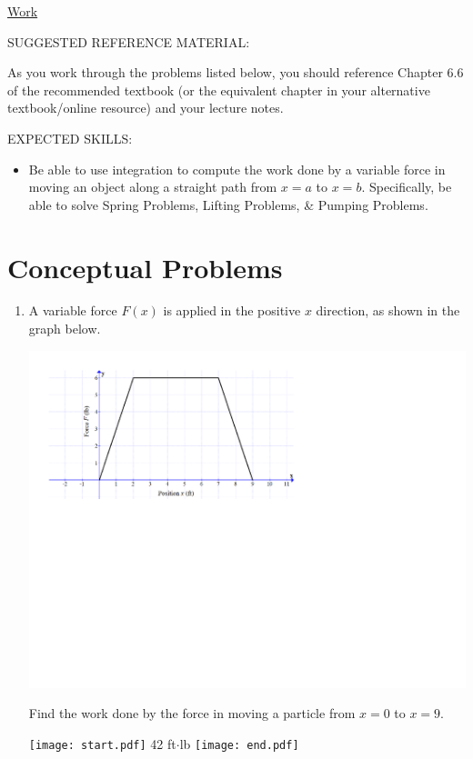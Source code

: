 \documentclass[12pt]{article}
\begin{document}
\begin{center}
\underline{\LARGE{Work}}
\end{center}

\bigskip

\noindent SUGGESTED REFERENCE MATERIAL:

\bigskip

\noindent As you work through the problems listed below, you should reference Chapter 6.6 of the recommended textbook (or the equivalent chapter in your alternative textbook/online resource) and your lecture notes.

\bigskip

\noindent EXPECTED SKILLS:

\begin{itemize}

\item Be able to use integration to compute the work done by a variable force in moving an object along a straight path from $x=a$ to $x=b$.  Specifically, be able to solve Spring Problems, Lifting Problems, \& Pumping Problems.

\end{itemize}

\section*{Conceptual Problems}

\begin{enumerate}

\item A variable force $F(x)$ is applied in the positive $x$ direction, as shown in the graph below.

\begin{center}
\includegraphics[scale=0.6]{graph1.pdf}
\end{center}

Find the work done by the force in moving a particle from $x=0$ to $x=9$.

\texttt{[image: start.pdf]}
{{42 ft$\cdot$lb}}
\texttt{[image: end.pdf]}


\end{enumerate}
\end{document}
